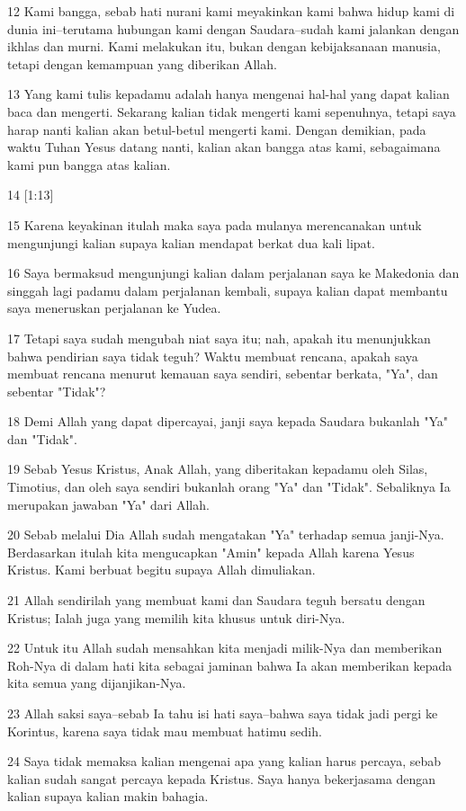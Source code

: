 \par 12 Kami bangga, sebab hati nurani kami meyakinkan kami bahwa hidup kami di dunia ini--terutama hubungan kami dengan Saudara--sudah kami jalankan dengan ikhlas dan murni. Kami melakukan itu, bukan dengan kebijaksanaan manusia, tetapi dengan kemampuan yang diberikan Allah.
\par 13 Yang kami tulis kepadamu adalah hanya mengenai hal-hal yang dapat kalian baca dan mengerti. Sekarang kalian tidak mengerti kami sepenuhnya, tetapi saya harap nanti kalian akan betul-betul mengerti kami. Dengan demikian, pada waktu Tuhan Yesus datang nanti, kalian akan bangga atas kami, sebagaimana kami pun bangga atas kalian.
\par 14 [1:13]
\par 15 Karena keyakinan itulah maka saya pada mulanya merencanakan untuk mengunjungi kalian supaya kalian mendapat berkat dua kali lipat.
\par 16 Saya bermaksud mengunjungi kalian dalam perjalanan saya ke Makedonia dan singgah lagi padamu dalam perjalanan kembali, supaya kalian dapat membantu saya meneruskan perjalanan ke Yudea.
\par 17 Tetapi saya sudah mengubah niat saya itu; nah, apakah itu menunjukkan bahwa pendirian saya tidak teguh? Waktu membuat rencana, apakah saya membuat rencana menurut kemauan saya sendiri, sebentar berkata, "Ya", dan sebentar "Tidak"?
\par 18 Demi Allah yang dapat dipercayai, janji saya kepada Saudara bukanlah "Ya" dan "Tidak".
\par 19 Sebab Yesus Kristus, Anak Allah, yang diberitakan kepadamu oleh Silas, Timotius, dan oleh saya sendiri bukanlah orang "Ya" dan "Tidak". Sebaliknya Ia merupakan jawaban "Ya" dari Allah.
\par 20 Sebab melalui Dia Allah sudah mengatakan "Ya" terhadap semua janji-Nya. Berdasarkan itulah kita mengucapkan "Amin" kepada Allah karena Yesus Kristus. Kami berbuat begitu supaya Allah dimuliakan.
\par 21 Allah sendirilah yang membuat kami dan Saudara teguh bersatu dengan Kristus; Ialah juga yang memilih kita khusus untuk diri-Nya.
\par 22 Untuk itu Allah sudah mensahkan kita menjadi milik-Nya dan memberikan Roh-Nya di dalam hati kita sebagai jaminan bahwa Ia akan memberikan kepada kita semua yang dijanjikan-Nya.
\par 23 Allah saksi saya--sebab Ia tahu isi hati saya--bahwa saya tidak jadi pergi ke Korintus, karena saya tidak mau membuat hatimu sedih.
\par 24 Saya tidak memaksa kalian mengenai apa yang kalian harus percaya, sebab kalian sudah sangat percaya kepada Kristus. Saya hanya bekerjasama dengan kalian supaya kalian makin bahagia.

